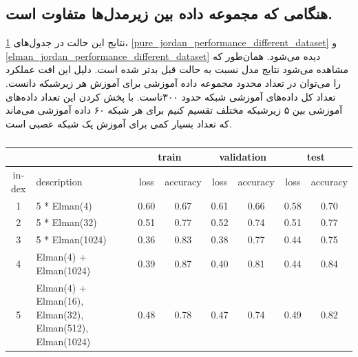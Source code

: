 \documentclass[12pt, a4paper]{article}
\begin{document}
\subsection*{هنگامی که مجموعه داده بین زیرمدل‌ها متفاوت است.}

نتایج این حالت در جدول‌های \ref{pure_elman_performance_different_dataset}، \ref{pure_jordan_performance_different_dataset}
و \ref{elman_jordan_performance_different_dataset} دیده می‌شود. همان‌طور که مشاهده می‌شود نتایج مدل نسبت به حالت
قبل بدتر شده است. دلیل این افت عملکرد را می‌توان در تعداد محدود مجموعه داده آموزشی برای آموزش هر زیرشبکه دانست.
تعداد کل داده‌های آموزشی شبکه حدود ۳۰۰تاست. با پخش کردن این تعداد داده‌های آموزشی بین ۵ زیرشبکه مختلف تقسیم کنیم
برای هر شبکه ۶۰ داده آموزشی می‌ماند که تعداد بسیار کمی برای آموزش یک شبکه عصبی است.

\begin{latin}
\begin{table}[h]
    \centering
    \caption{}
    \label{pure_elman_performance_different_dataset}
    \begin{tabular}{c|p{3cm}|c|c|c|c|c|c}
        & & \multicolumn{2}{c|}{\cellcolor{teal!30}train} & \multicolumn{2}{c|}{\cellcolor{teal!30}validation} &  \multicolumn{2}{c}{\cellcolor{teal!30}test} \\ \hline
        index & description & loss & accuracy & loss & accuracy & loss & accuracy\\ \hline
        1 & 5 * Elman(4) & 0.60 & 0.67 & 0.61 & 0.66 & 0.58 & 0.70 \\
        2 & 5 * Elman(32) & 0.51 & 0.77 & 0.52 & 0.74 & 0.51 & 0.77 \\
        3 & 5 * Elman(1024) & 0.36 & 0.83 & 0.38 & 0.77 & 0.44 & 0.75 \\
        4 & Elman(4) + Elman(1024) & 0.39 & 0.87 & 0.40 & 0.81 & 0.44 & 0.84 \\
        5 & Elman(4) + Elman(16), Elman(32), Elman(512), Elman(1024) & 0.48 & 0.78 & 0.47 & 0.74 & 0.49 & 0.82 \\
     \end{tabular}
\end{table}
\end{latin}
\end{document}
